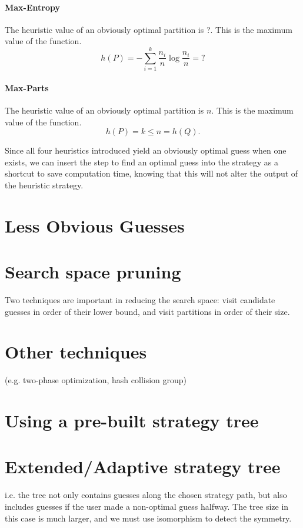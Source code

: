 \paragraph{Max-Entropy}
The \maxent{} heuristic value of an obviously optimal partition is ?. This is the maximum value of the function.
\[
h(P) = - \sum_{i=1}^k \frac{n_i}{n} \log \frac{n_i}{n} = ?
\]

\paragraph{Max-Parts}
The \maxpar{} heuristic value of an obviously optimal partition is $n$. This is the maximum value of the function.
\[
h(P) = k \le n = h(Q).
\]

Since all four heuristics introduced yield an obviously optimal guess when one exists, we can insert the step to find an optimal guess into the strategy as a shortcut to save computation time, knowing that this will not alter the output of the heuristic strategy.

\section{Less Obvious Guesses}



\section{Search space pruning}

Two techniques are important in reducing the search space: visit candidate guesses in order of their lower bound, and visit partitions in order of their size.

\section{Other techniques}

(e.g. two-phase optimization, hash collision group)

\section{Using a pre-built strategy tree}

\section{Extended/Adaptive strategy tree}

i.e. the tree not only contains guesses along the chosen strategy path, but also includes guesses if the user made a non-optimal guess halfway. The tree size in this case is much larger, and we must use isomorphism to detect the symmetry.

 
